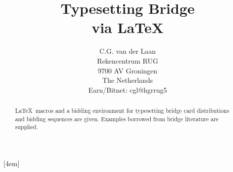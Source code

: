  
%
\setlength{\textwidth}{7in}
\setlength{\textheight}{9in}
\setlength{\oddsidemargin}{-.4in}
\setlength{\topmargin}{-.5in}
\newlength{\br}
\setlength{\br}{8em}
%
\renewcommand{\c}{\(\clubsuit\)}
\renewcommand{\d}{\(\diamondsuit\)}
\newcommand{\h}{\(\heartsuit\)}
\newcommand{\s}{\(\spadesuit\)}
%
\newcommand{\hand}[4]{
 \begin{minipage}[t]{\br}%
 \begin{tabbing}
  \(\spadesuit\)  \= #1 \\
  \(\heartsuit\)  \> #2 \\
  \(\diamondsuit\)\> #3 \\
  \(\clubsuit\)   \> #4
 \end{tabbing}
 \end{minipage}     }%
%
\newsavebox{\NESW}
\savebox{\NESW}[4em]{%
\raisebox{-1.5\baselineskip}%
{
}          }%
%
\newcommand{\crdima}[6]{%
\begin{tabular}[t]{lll}
 #1 & #3             & #2\\
 #4 & \usebox{\NESW} & #5\\
    & #6             &
\end{tabular}
}%
%
\newenvironment{bidding}%
{\begin{tabbing}
 xxxxxx\=xxxxxx\=xxxxxx\=xxxxxx \kill
 West  \>North \>East  \> South\\
}{\end{tabbing} }%
%

\title{Typesetting Bridge\\
 via \LaTeX}
\author{C.G. van der Laan\\
Rekencentrum RUG\\
9700 AV Groningen\\
The Netherlands\\
Earn/Bitnet: cgl@hgrrug5\\
\date{}}
\maketitle
\begin{abstract}
\LaTeX\ macros and a bidding environment
for typesetting bridge card distributions and bidding
sequences are given.
Examples borrowed from bridge literature are supplied.
\end{abstract}
%
